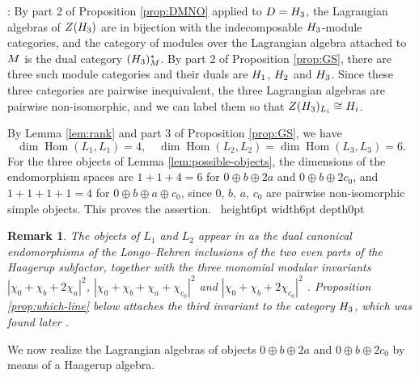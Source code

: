 \documentclass[leqno]{article}
\let\cal\relax
\newcommand{\cal}{\mathcal}
\newcommand{\qed}{\hfill \vrule height6pt  width6pt depth0pt}
\newtheorem{remark}[thm]{Remark}
\newenvironment{proof}[1][]{\noindent {\it Proof #1} : }{\hbox{~}\qed
\smallskip
}
\numberwithin{equation}{section}
\begin{document}
\begin{proof}
By part 2 of Proposition \ref{prop:DMNO} applied to $\cal D = \cal H_3$, the Lagrangian algebras of $Z(\cal H_3)$ are in bijection with the indecomposable $\cal H_3$-module categories, and the category of modules over the Lagrangian algebra attached to $\cal M$ is the dual category $(\cal H_3)^*_{\cal M}$. By part 2 of Proposition \ref{prop:GS}, there are three such module categories and their duals are $\cal H_1$, $\cal H_2$ and $\cal H_3$. Since these three categories are pairwise inequivalent, the three Lagrangian algebras are pairwise non-isomorphic, and we can label them so that $Z(\cal H_3)_{L_i} \cong \cal H_i$.

By Lemma \ref{lem:rank} and part 3 of Proposition \ref{prop:GS}, we have
\begin{equation}
\label{eq:end-dims}
\dim\operatorname{Hom}(L_1,L_1) = 4,\quad \dim\operatorname{Hom}(L_2,L_2) = \dim\operatorname{Hom}(L_3,L_3) = 6.
\end{equation}
For the three objects of Lemma \ref{lem:possible-objects}, the dimensions of the endomorphism spaces are $1+1+4 = 6$ for $0 \oplus b \oplus 2a$ and $0 \oplus b \oplus 2c_0$, and $1+1+1+1 = 4$ for $0 \oplus b \oplus a \oplus c_0$, since $0$, $b$, $a$, $c_0$ are pairwise non-isomorphic simple objects. This proves the assertion.
\end{proof}

\begin{remark}\normalfont
The objects of $L_1$ and $L_2$ appear in \cite[pp.~18--19]{EvG11} as the dual canonical endomorphisms of the Longo--Rehren inclusions of the two even parts of the Haagerup subfactor, together with the three monomial modular invariants $|\chi_0+\chi_b+2\chi_a|^2$, $|\chi_0+\chi_b+\chi_a+\chi_{c_0}|^2$ and $|\chi_0+\chi_b+2\chi_{c_0}|^2$ \cite[Proposition 4 p.~32]{EvG11}. Proposition \ref{prop:which-line} below attaches the third invariant to the category $\cal H_3$, which was found later \cite{GrS12}.
\end{remark}

We now realize the Lagrangian algebras of objects $0 \oplus b \oplus 2a$ and $0 \oplus b \oplus 2c_0$ by means of a Haagerup algebra.
\end{document}
